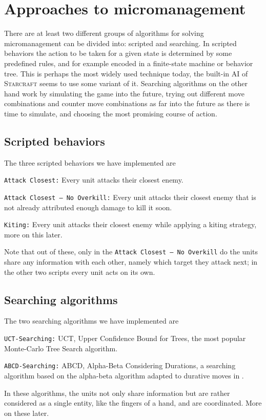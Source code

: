 \section{Approaches to micromanagement}
There are at least two different groups of algorithms for solving micromanagement can be divided into: scripted and searching.
In scripted behaviors the action to be taken for a given state is determined by some predefined rules, and for example encoded in a finite-state machine or behavior tree.
This is perhaps the most widely used technique today, the built-in AI of \textsc{Starcraft} seems to use some variant of it.
Searching algorithms on the other hand work by simulating the game into the future, trying out different move combinations and counter move combinations as far into the future as there is time to simulate, and choosing the most promising course of action.

\subsection{Scripted behaviors}
The three scripted behaviors we have implemented are
\begin{shortitem}
\item \texttt{Attack Closest:}					Every unit attacks their closest enemy.
\item \texttt{Attack Closest -- No Overkill:}	Every unit attacks their closest enemy that is not already attributed enough damage to kill it soon.
\item \texttt{Kiting:}							Every unit attacks their closest enemy while applying a kiting strategy, more on this later.
\end{shortitem}

Note that out of these, only in the \texttt{Attack Closest -- No Overkill} do the units share any information with each other, namely which target they attack next; in the other two scripts every unit acts on its own.

\subsection {Searching algorithms}
The two searching algorithms we have implemented are
\begin{shortitem}
\item \texttt{UCT-Searching:}	UCT, Upper Confidence Bound for Trees, the most popular Monte-Carlo Tree Search algorithm. \cite{mcts}
\item \texttt{ABCD-Searching:}	ABCD, Alpha-Beta Considering Durations, a searching algorithm based on the alpha-beta algorithm adapted to durative moves in \cite{abcd}.
\end{shortitem}
In these algorithms, the units not only share information but are rather considered as a single entity, like the fingers of a hand, and are coordinated.
More on these later.
